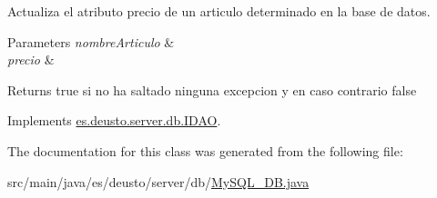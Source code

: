 Actualiza el atributo precio de un articulo determinado en la base de datos. 
\begin{DoxyParams}{Parameters}
{\em nombre\+Articulo} & \\
\hline
{\em precio} & \\
\hline
\end{DoxyParams}
\begin{DoxyReturn}{Returns}
true si no ha saltado ninguna excepcion y en caso contrario false 
\end{DoxyReturn}


Implements \mbox{\hyperlink{interfacees_1_1deusto_1_1server_1_1db_1_1_i_d_a_o_ae00eb9c5a9caa20fc72cad7b8054ce17}{es.\+deusto.\+server.\+db.\+I\+D\+AO}}.



The documentation for this class was generated from the following file\+:\begin{DoxyCompactItemize}
\item 
src/main/java/es/deusto/server/db/\mbox{\hyperlink{_my_s_q_l___d_b_8java}{My\+S\+Q\+L\+\_\+\+D\+B.\+java}}\end{DoxyCompactItemize}
